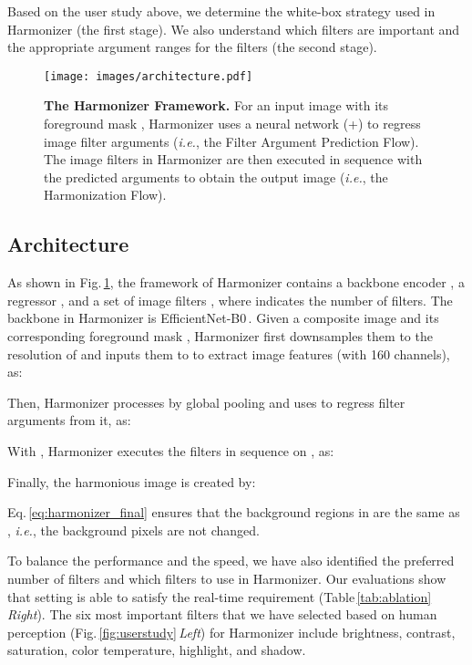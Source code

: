 \documentclass[runningheads]{llncs}
\begin{document}
Based on the user study above, we determine the white-box strategy used in Harmonizer (the first stage). We also understand which filters are important and the appropriate argument ranges for the filters (the second stage).

 \begin{figure}[t]
\centering
\texttt{[image: images/architecture.pdf]}
{\begin{center}
\vspace{-0.5cm}
\caption{\textbf{The Harmonizer Framework.} For an input image  with its foreground mask , Harmonizer uses a neural network (+) to regress  image filter arguments  (\textit{i.e.}, the Filter Argument Prediction Flow). The image filters  in Harmonizer are then executed in sequence with the predicted arguments  to obtain the 
output image  (\textit{i.e.}, the Harmonization Flow).}
\label{fig:architecture}
\end{center}
}
\vspace{-0.7cm}
\end{figure}

\subsection{Architecture}\label{sec:architectural_details}
As shown in Fig.\,\ref{fig:architecture}, the framework of Harmonizer contains a backbone encoder , a regressor , and a set of image filters , where  indicates the number of filters.
The backbone  in Harmonizer is EfficientNet-B0\,\cite{EfficientNet}.
Given a composite image  and its corresponding foreground mask ,
Harmonizer first downsamples them to the resolution of  and inputs them to  to extract image features  (with 160 channels), as:

Then, Harmonizer processes  by global pooling and uses  to regress filter arguments  from it, as:

With , Harmonizer executes the  filters in sequence on , as:

Finally, the harmonious image  is created by:

Eq.\,\ref{eq:harmonizer_final} ensures that the background regions in  are the same as , {\it i.e.}, the background pixels are not changed.



To balance the performance and the speed, we have also identified the preferred number of filters  and which  filters to use in Harmonizer. Our evaluations show that setting  is able to satisfy the real-time requirement (Table\,\ref{tab:ablation} {\it Right}). 
The six most important filters that we have selected based on human perception (Fig.\,\ref{fig:userstudy}\,\textit{Left}) for Harmonizer include brightness, contrast, saturation, color temperature, highlight, and shadow.
\end{document}
